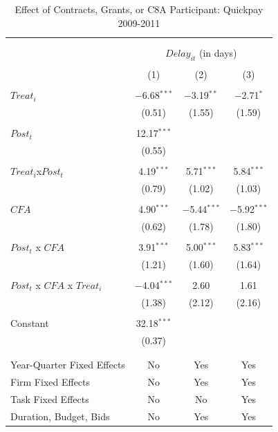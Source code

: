 \documentclass[
]{article}
\begin{document}
\begin{table}[H] \centering 
  \caption{Effect of Contracts, Grants, or C8A Participant: Quickpay 2009-2011} 
  \label{} 
\small 
\begin{tabular}{@{\extracolsep{-2pt}}lccc} 
\\[-1.8ex]\hline 
\hline \\[-1.8ex] 
\\[-1.8ex] & \multicolumn{3}{c}{$Delay_{it}$ (in days)} \\ 
\\[-1.8ex] & (1) & (2) & (3)\\ 
\hline \\[-1.8ex] 
 $Treat_i$ & $-$6.68$^{***}$ & $-$3.19$^{**}$ & $-$2.71$^{*}$ \\ 
  & (0.51) & (1.55) & (1.59) \\ 
  & & & \\ 
 $Post_t$ & 12.17$^{***}$ &  &  \\ 
  & (0.55) &  &  \\ 
  & & & \\ 
 $Treat_i$x$Post_t$ & 4.19$^{***}$ & 5.71$^{***}$ & 5.84$^{***}$ \\ 
  & (0.79) & (1.02) & (1.03) \\ 
  & & & \\ 
 $CFA$ & 4.90$^{***}$ & $-$5.44$^{***}$ & $-$5.92$^{***}$ \\ 
  & (0.62) & (1.78) & (1.80) \\ 
  & & & \\ 
 $Post_t$ x $CFA$ & 3.91$^{***}$ & 5.00$^{***}$ & 5.83$^{***}$ \\ 
  & (1.21) & (1.60) & (1.64) \\ 
  & & & \\ 
 $Post_t$ x $CFA$ x $Treat_i$ & $-$4.04$^{***}$ & 2.60 & 1.61 \\ 
  & (1.38) & (2.12) & (2.16) \\ 
  & & & \\ 
 Constant & 32.18$^{***}$ &  &  \\ 
  & (0.37) &  &  \\ 
  & & & \\ 
\hline \\[-1.8ex] 
Year-Quarter Fixed Effects & No & Yes & Yes \\ 
Firm Fixed Effects & No & Yes & Yes \\ 
Task Fixed Effects & No & No & Yes \\ 
Duration, Budget, Bids & No & Yes & Yes \\ 

\end{tabular}
\end{table}
\end{document}
